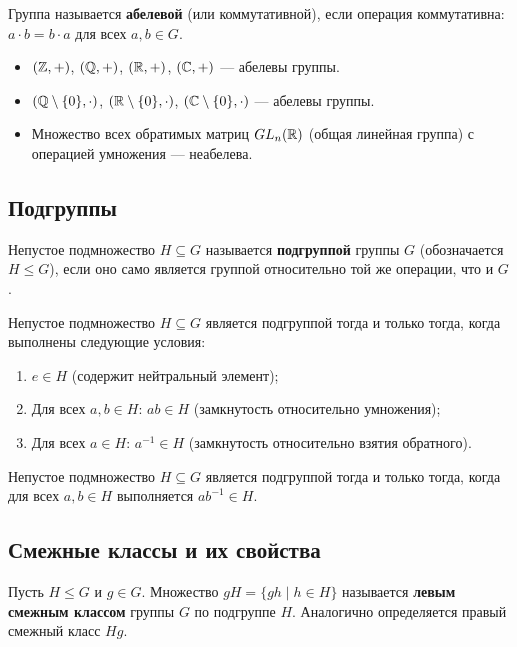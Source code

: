 \documentclass[10pt]{article}
\begin{document}
Группа называется \textbf{абелевой} (или коммутативной), если операция коммутативна: $a \cdot b = b \cdot a$ для всех $a,b \in G$.

\begin{example}
    \begin{itemize}
        \item $(\mathbb{Z}, +)$, $(\mathbb{Q}, +)$, $(\mathbb{R}, +)$, $(\mathbb{C}, +)$ — абелевы группы.
        \item $(\mathbb{Q} \setminus \{0\}, \cdot)$, $(\mathbb{R} \setminus \{0\}, \cdot)$, $(\mathbb{C} \setminus \{0\}, \cdot)$ — абелевы группы.
        \item Множество всех обратимых матриц $GL_n(\mathbb{R})$ (общая линейная группа) с операцией умножения — неабелева.
    \end{itemize}
\end{example}

\subsection{Подгруппы}
\begin{definition}
Непустое подмножество $H \subseteq G$ называется \textbf{подгруппой} группы $G$ (обозначается $H \le G$), если оно само является группой относительно той же операции, что и $G$.
\end{definition}

\begin{stat}
Непустое подмножество $H \subseteq G$ является подгруппой тогда и только тогда, когда выполнены следующие условия:
\begin{enumerate}
    \item $e \in H$ (содержит нейтральный элемент);
    \item Для всех $a, b \in H$: $ab \in H$ (замкнутость относительно умножения);
    \item Для всех $a \in H$: $a^{-1} \in H$ (замкнутость относительно взятия обратного).
\end{enumerate}
\end{stat}

\begin{stat}
Непустое подмножество $H \subseteq G$ является подгруппой тогда и только тогда, когда для всех $a, b \in H$ выполняется $ab^{-1} \in H$.
\end{stat}

\subsection{Смежные классы и их свойства}
\begin{definition}
Пусть $H \le G$ и $g \in G$. Множество $gH = \{gh \mid h \in H\}$ называется \textbf{левым смежным классом} группы $G$ по подгруппе $H$. Аналогично определяется правый смежный класс $Hg$.
\end{definition}
\end{document}
